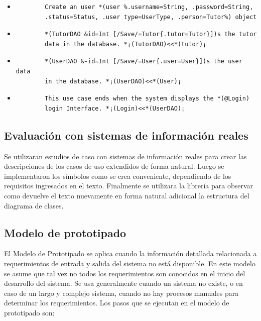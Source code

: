 \begin{itemize}
	\item \begin{verbatim}
		Create an user *(user %.username=String, .password=String,
		.status=Status, .user type=UserType, .person=Tutor%) object
	\end{verbatim}
	
	\item \begin{verbatim}
		*(TutorDAO &id=Int [/Save/=Tutor{.tutor=Tutor}])s the tutor 
		data in the database. *¡(TutorDAO)<<*(tutor)¡
	\end{verbatim}
	
	\item \begin{verbatim}
		*(UserDAO &-id=Int [/Save/=User{.user=User}])s the user data 
		in the database. *¡(UserDAO)<<*(User)¡
	\end{verbatim}
	
	\item \begin{verbatim}
		This use case ends when the system displays the *(@Login) 
		login Interface. *¡(Login)<<*(UserDAO)¡
	\end{verbatim}
	
\end{itemize}

\subsection{Evaluación con sistemas de información reales}

Se utilizaran estudios de caso con sistemas de información reales para crear las descripciones de los casos de uso extendidos de forma natural. Luego se implementaron los símbolos como se crea conveniente, dependiendo de los requisitos ingresados en el texto. Finalmente se utilizara la librería para observar como devuelve el texto nuevamente en forma natural adicional la estructura del diagrama de clases.

\subsection{Modelo de prototipado}
El Modelo de Prototipado se aplica cuando la información detallada relacionada a requerimientos de entrada y salida del sistema no está disponible. En este modelo se asume que tal vez no todos los requerimientos son conocidos en el inicio del desarrollo del sistema. Se usa generalmente cuando un sistema no existe, o en caso de un largo y complejo sistema, cuando no hay procesos manuales para determinar los requerimientos. Los pasos que se ejecutan en el modelo de prototipado son: 

